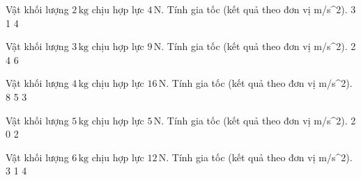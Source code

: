\begin{ex}
Vật khối lượng $2\,\text{kg}$ chịu hợp lực $4\,\text{N}$. Tính gia tốc (kết quả theo đơn vị m/s^2).
\choice
{3}
{}
{1}
{4}
\end{ex}

\begin{ex}
Vật khối lượng $3\,\text{kg}$ chịu hợp lực $9\,\text{N}$. Tính gia tốc (kết quả theo đơn vị m/s^2).
\choice
{2}
{4}
{}
{6}
\end{ex}

\begin{ex}
Vật khối lượng $4\,\text{kg}$ chịu hợp lực $16\,\text{N}$. Tính gia tốc (kết quả theo đơn vị m/s^2).
\choice
{8}
{5}
{3}
{}
\end{ex}

\begin{ex}
Vật khối lượng $5\,\text{kg}$ chịu hợp lực $5\,\text{N}$. Tính gia tốc (kết quả theo đơn vị m/s^2).
\choice
{}
{2}
{0}
{2}
\end{ex}

\begin{ex}
Vật khối lượng $6\,\text{kg}$ chịu hợp lực $12\,\text{N}$. Tính gia tốc (kết quả theo đơn vị m/s^2).
\choice
{3}
{}
{1}
{4}
\end{ex}

